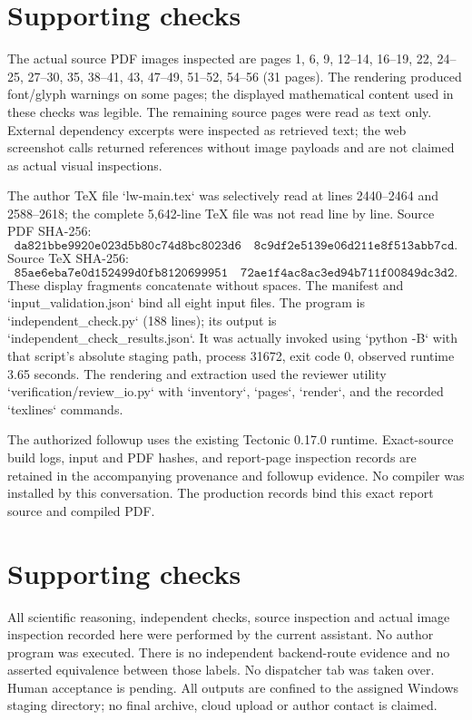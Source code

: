 \documentclass[10pt]{article}
\begin{document}
\section*{Supporting checks}
The actual source PDF images inspected are pages 1, 6, 9, 12–14, 16–19, 22, 24–25, 27–30, 35, 38–41, 43, 47–49, 51–52, 54–56 (31 pages). The rendering produced font/glyph warnings on some pages; the displayed mathematical content used in these checks was legible. The remaining source pages were read as text only. External dependency excerpts were inspected as retrieved text; the web screenshot calls returned references without image payloads and are not claimed as actual visual inspections.\par
The author TeX file `lw-main.tex` was selectively read at lines 2440–2464 and 2588–2618; the complete 5,642-line TeX file was not read line by line. Source PDF SHA-256: \[\texttt{da821bbe9920e023d5b80c74d8bc8023d6}
\quad
\texttt{8c9df2e5139e06d211e8f513abb7cd}.\] Source TeX SHA-256: \[\texttt{85ae6eba7e0d152499d0fb8120699951}
\quad
\texttt{72ae1f4ac8ac3ed94b711f00849dc3d2}.\] These display fragments concatenate without spaces. The manifest and `input\_validation.json` bind all eight input files. The program is `independent\_check.py` (188 lines); its output is `independent\_check\_results.json`. It was actually invoked using `python -B` with that script’s absolute staging path, process 31672, exit code 0, observed runtime 3.65 seconds. The rendering and extraction used the reviewer utility `verification/review\_io.py` with `inventory`, `pages`, `render`, and the recorded `texlines` commands.\par
The authorized followup uses the existing Tectonic 0.17.0 runtime. Exact-source build logs, input and PDF hashes, and report-page inspection records are retained in the accompanying provenance and followup evidence. No compiler was installed by this conversation. The production records bind this exact report source and compiled PDF.\par
\section*{Supporting checks}
All scientific reasoning, independent checks, source inspection and actual image inspection recorded here were performed by the current assistant. No author program was executed. There is no independent backend-route evidence and no asserted equivalence between those labels. No dispatcher tab was taken over. Human acceptance is pending. All outputs are confined to the assigned Windows staging directory; no final archive, cloud upload or author contact is claimed.\par
\end{document}
